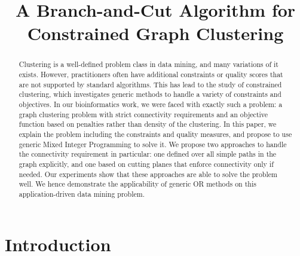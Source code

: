\documentclass[conference]{IEEEtran}
\begin{document}
\title{A Branch-and-Cut Algorithm for Constrained Graph Clustering}

\author{
\and
{}
\and
{}
\and
{}
}

\maketitle

\begin{abstract}
Clustering is a well-defined problem class in data mining, and many variations of it exists. However, practitioners often have additional constraints or quality scores that are not supported by standard algorithms. This has lead to the study of constrained clustering, which investigates generic methods to handle a variety of constraints and objectives. In our bioinformatics work, we were faced with exactly such a problem: a graph clustering problem with strict connectivity requirements and an objective function based on penalties rather than density of the clustering. In this paper, we explain the problem including the constraints and quality measures, and propose to use generic Mixed Integer Programming to solve it. We propose two approaches to handle the connectivity requirement in particular: one defined over all simple paths in the graph explicitly, and one based on cutting planes that enforce connectivity only if needed. Our experiments show that these approaches are able to solve the problem well. We hence demonstrate the applicability of generic OR methods on this application-driven data mining problem.
\end{abstract}

\section{Introduction}
\label{introduction}
\end{document}
